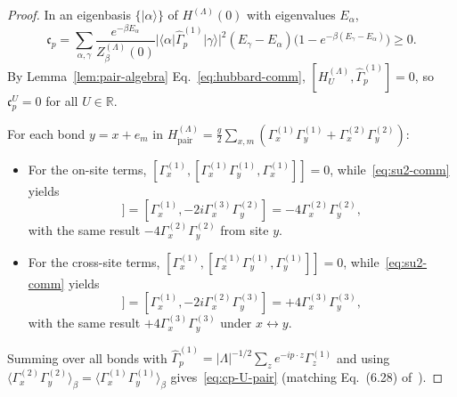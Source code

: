 \documentclass[11pt]{article}
\theoremstyle{definition}
\theoremstyle{remark}
\newcommand{\bbR}{\mathbb{R}}
\begin{document}
\begin{proof}
In an eigenbasis $\{|\alpha\rangle\}$ of $H^{(\Lambda)}(0)$ with eigenvalues $E_\alpha$,
\begin{equation*}
\mathfrak{c}_p = \sum_{\alpha,\gamma} \frac{e^{-\beta E_\alpha}}{Z_\beta^{(\Lambda)}(0)} |\langle \alpha|\hat{\Gamma}_p^{(1)}|\gamma\rangle|^2 (E_\gamma - E_\alpha)\bigl(1 - e^{-\beta(E_\gamma - E_\alpha)}\bigr) \ge 0.
\end{equation*}
By Lemma~\ref{lem:pair-algebra} Eq.~\eqref{eq:hubbard-comm}, $[H_U^{(\Lambda)}, \hat{\Gamma}_p^{(1)}] = 0$, so $\mathfrak{c}_p^U = 0$ for all $U \in \bbR$.

For each bond $y = x + e_m$ in $H_{\mathrm{pair}}^{(\Lambda)} = \frac{g}{2}\sum_{x,m}(\Gamma_x^{(1)}\Gamma_y^{(1)} + \Gamma_x^{(2)}\Gamma_y^{(2)})$:
\begin{itemize}[leftmargin=2em]
\item For the on-site terms, $[\Gamma_x^{(1)}, [\Gamma_x^{(1)}\Gamma_y^{(1)}, \Gamma_x^{(1)}]] = 0$, while~\eqref{eq:su2-comm} yields
\begin{equation*}
[\Gamma_x^{(1)}, [\Gamma_x^{(2)}\Gamma_y^{(2)}, \Gamma_x^{(1)}]] = [\Gamma_x^{(1)}, -2i\Gamma_x^{(3)}\Gamma_y^{(2)}] = -4\Gamma_x^{(2)}\Gamma_y^{(2)},
\end{equation*}
with the same result $-4\Gamma_x^{(2)}\Gamma_y^{(2)}$ from site $y$.
\item For the cross-site terms, $[\Gamma_x^{(1)}, [\Gamma_x^{(1)}\Gamma_y^{(1)}, \Gamma_y^{(1)}]] = 0$, while~\eqref{eq:su2-comm} yields
\begin{equation*}
[\Gamma_x^{(1)}, [\Gamma_x^{(2)}\Gamma_y^{(2)}, \Gamma_y^{(1)}]] = [\Gamma_x^{(1)}, -2i\Gamma_x^{(2)}\Gamma_y^{(3)}] = +4\Gamma_x^{(3)}\Gamma_y^{(3)},
\end{equation*}
with the same result $+4\Gamma_x^{(3)}\Gamma_y^{(3)}$ under $x \leftrightarrow y$.
\end{itemize}
Summing over all bonds with $\hat{\Gamma}_p^{(1)} = |\Lambda|^{-1/2}\sum_z e^{-ip\cdot z}\Gamma_z^{(1)}$ and using $\langle \Gamma_x^{(2)}\Gamma_y^{(2)}\rangle_\beta = \langle \Gamma_x^{(1)}\Gamma_y^{(1)}\rangle_\beta$ gives~\eqref{eq:cp-U-pair} (matching Eq.~(6.28) of~\cite{koma2022}).


\end{proof}
\end{document}
